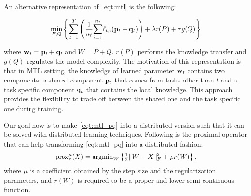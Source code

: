 An alternative representation of~\ref{eqt:mtl} is the following:
\begin{small}
\begin{align}
\min_{P, Q} \left\{ \displaystyle{\sum_{t=1}^T} \left(\frac{1}{n_{t}} \displaystyle{\sum_{i=1}^{n_{t}}}
\ell_{t,i}(\mathbf{p}_{t} + \mathbf{q}_{t})\right) + \lambda r(P) + \tau g(Q) \right\}\label{eqt:mtl_pq}
\end{align}
\end{small}
where $\mathbf{w}_{t} = \mathbf{p}_{t} + \mathbf{q}_{t}$ and $W = P + Q$. $r(P)$ performs the knowledge transfer and $g(Q)$ regulates the model complexity. The motivation of this representation is that in MTL setting, the knowledge of learned parameter $\mathbf{w}_{t}$ contains two components: a shared component $\mathbf{p}_{t}$ that comes from tasks other than $t$ and a task specific component $\mathbf{q}_{t}$ that contains the local knowledge. This approach provides the flexibility to trade off between the shared one and the task specific one during training. 

Our goal now is to make~\ref{eqt:mtl_pq} into a distributed version such that it can be solved with distributed learning techniques. Following is the proximal operator that can help transforming \ref{eqt:mtl_pq} into a distributed fashion:
\begin{align}
\text{prox}_{r}^{\mu}(X) = 
     \mathop{\rm argmin}\nolimits_{W} \left\{\tfrac{1}{2}\|W-X\|_{F}^{2} + \mu r(W) \right\},
\label{def:prox}
\end{align}
where $\mu$ is a coefficient obtained by the step size and the regularization parameters, and $r(W)$ is required to be a proper and lower semi-continuous function.


